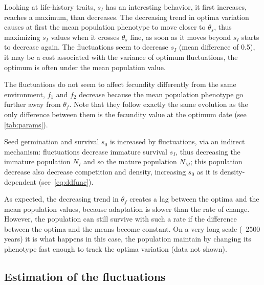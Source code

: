 Looking at life-history traits, $s_I$ has an interesting behavior, it first increases, reaches a maximum, than decreases. The decreasing trend in optima variation causes at first the mean population phenotype to move closer to $\theta_s$, thus maximizing $s_I$ values when it crosses $\theta_s$ line, as soon as it moves beyond $s_I$ starts to decrease again. The fluctuations seem to decrease $s_I$ (mean difference of 0.5), it may be a cost associated with the variance of optimum fluctuations, the optimum is often under the mean population value.

The fluctuations do not seem to affect fecundity differently from the same environment, $f_1$ and $f_2$ decrease because the mean population phenotype go further away from $\theta_f$. Note that they follow exactly the same evolution as the only difference between them is the fecundity value at the optimum date (see \autoref{tab:params}).

Seed germination and survival $s_0$ is increased by fluctuations, via an indirect mechanism: fluctuations decrease immature survival $s_I$, thus decreasing the immature population $N_I$ and so the mature population $N_M$; this population decrease also decrease competition and density, increasing $s_0$ as it is density-dependent (see~\autoref{eq:ddfunc}).

As expected, the decreasing trend in $\theta_f$ creates a lag between the optima and the mean population values, because adaptation is slower than the rate of change. However, the population can still survive with such a rate if the difference between the optima and the means become constant. On a very long scale (~2500 years) it is what happens in this case, the population maintain by changing its phenotype fast enough to track the optima variation (data not shown).

\subsection*{Estimation of the fluctuations}


